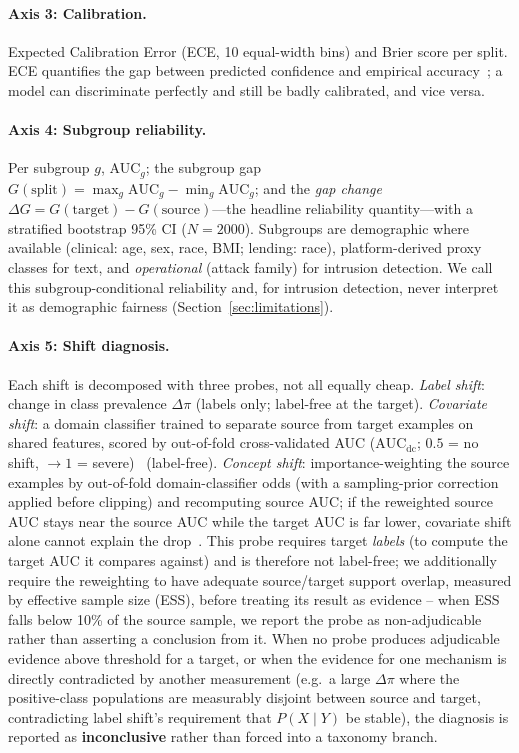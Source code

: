 \documentclass[11pt]{article}
\begin{document}
\paragraph{Axis 3: Calibration.} Expected Calibration Error (ECE, 10 equal-width bins) and Brier
score per split. ECE quantifies the gap between predicted confidence and empirical
accuracy~\citep{guo2017calibration}; a model can discriminate perfectly and still be badly
calibrated, and vice versa.

\paragraph{Axis 4: Subgroup reliability.} Per subgroup $g$, AUC$_g$; the subgroup gap
$G(\text{split}) = \max_g \text{AUC}_g - \min_g \text{AUC}_g$; and the \emph{gap change}
$\Delta G = G(\text{target}) - G(\text{source})$---the headline reliability quantity---with a
stratified bootstrap 95\% CI ($N=2000$). Subgroups are demographic where available (clinical:
age, sex, race, BMI; lending: race), platform-derived proxy classes for text, and \emph{operational}
(attack family) for intrusion detection. We call this subgroup-conditional reliability and, for
intrusion detection, never interpret it as demographic fairness (Section~\ref{sec:limitations}).

\paragraph{Axis 5: Shift diagnosis.} Each shift is decomposed with three probes, not all equally
cheap. \emph{Label shift}: change in class prevalence $\Delta\pi$ (labels only; label-free at the
target). \emph{Covariate shift}: a domain classifier trained to separate source from target
examples on shared features, scored by out-of-fold cross-validated AUC ($\text{AUC}_{\text{dc}}$;
$0.5$ = no shift, $\rightarrow 1$ = severe)~\citep{rabanser2019failing} (label-free). \emph{Concept
shift}: importance-weighting the source examples by out-of-fold domain-classifier odds (with a
sampling-prior correction applied before clipping) and recomputing source AUC; if the reweighted
source AUC stays near the source AUC while the target AUC is far lower, covariate shift alone
cannot explain the drop~\citep{lipton2018label}. This probe requires target \emph{labels} (to
compute the target AUC it compares against) and is therefore not label-free; we additionally
require the reweighting to have adequate source/target support overlap, measured by effective
sample size (ESS), before treating its result as evidence -- when ESS falls below 10\% of the
source sample, we report the probe as non-adjudicable rather than asserting a conclusion from it.
When no probe produces adjudicable evidence above threshold for a target, or when the evidence for
one mechanism is directly contradicted by another measurement (e.g.\ a large $\Delta\pi$ where the
positive-class populations are measurably disjoint between source and target, contradicting label
shift's requirement that $P(X\mid Y)$ be stable), the diagnosis is reported as
\textbf{inconclusive} rather than forced into a taxonomy branch.
\end{document}
